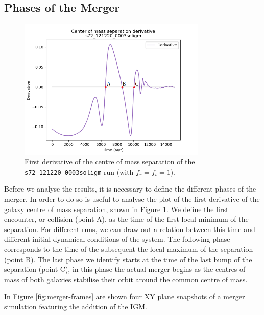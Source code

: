 \documentclass[a4paper,12pt, english]{article}
\begin{document}
\subsection{Phases of the Merger}\par
\begin{figure}[!h]
    \centering
    \includegraphics[width=0.8\textwidth]{separation/s72_121220_0003soligm_separation_derivative_with_points.png}
    \caption{First derivative of the centre of mass separation of the \texttt{s72\_121220\_0003soligm} run (with \(f_r = f_t = 1\)).}
    \label{fig:sep-derivative}
\end{figure}\par
Before we analyse the results, it is necessary to define the different phases of the merger. In order to do so is useful to analyse the plot of the first derivative of the galaxy centre of mass separation, shown in Figure \ref{fig:sep-derivative}. We define the first encounter, or collision (point A), as the time of the first local minimum of the separation. For different runs, we can draw out a relation between this time and different initial dynamical conditions of the system. The following phase corresponds to the time of the subsequent the local maximum of the separation (point B). The last phase we identify starts at the time of the last bump of the separation (point C), in this phase the actual merger begins as the centres of mass of both galaxies stabilise their orbit around the common centre of mass.\par
\smallskip
In Figure \ref{fig:merger-frames} are shown four XY plane snapshots of a merger simulation featuring the addition of the IGM.\par
\end{document}
